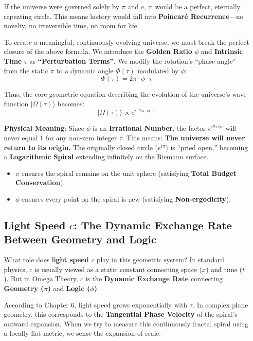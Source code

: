 If the universe were governed solely by $\pi$ and $e$, it would be a perfect, eternally repeating circle. This means history would fall into \textbf{Poincar\'{e} Recurrence}---no novelty, no irreversible time, no room for life.

To create a meaningful, continuously evolving universe, we must break the perfect closure of the above formula. We introduce the \textbf{Golden Ratio $\phi$} and \textbf{Intrinsic Time $\tau$} as \textbf{``Perturbation Terms''}.
We modify the rotation's ``phase angle'' from the static $\pi$ to a dynamic angle $\Phi(\tau)$ modulated by $\phi$:
\[\Phi(\tau) = 2\pi \cdot \phi \cdot \tau\]

Thus, the core geometric equation describing the evolution of the universe's wave function $|\Omega(\tau)\rangle$ becomes:
\[|\Omega(\tau)\rangle \propto e^{i \cdot 2\pi \cdot \phi \cdot \tau}\]

\textbf{Physical Meaning}:
Since $\phi$ is an \textbf{Irrational Number}, the factor $e^{i 2\pi \phi \tau}$ will never equal $1$ for any non-zero integer $\tau$.
This means: \textbf{The universe will never return to its origin.}
The originally closed circle ($e^{i\pi}$) is ``pried open,'' becoming a \textbf{Logarithmic Spiral} extending infinitely on the Riemann surface.
\begin{itemize}
\item \textbf{$\pi$} ensures the spiral remains on the unit sphere (satisfying \textbf{Total Budget Conservation}).
\item \textbf{$\phi$} ensures every point on the spiral is new (satisfying \textbf{Non-ergodicity}).
\end{itemize}

\subsection{Light Speed \texorpdfstring{$c$}{c}: The Dynamic Exchange Rate Between Geometry and Logic}

What role does \textbf{light speed $c$} play in this geometric system?
In standard physics, $c$ is usually viewed as a static constant connecting space ($x$) and time ($t$). But in Omega Theory, $c$ is the \textbf{Dynamic Exchange Rate} connecting \textbf{Geometry ($\pi$)} and \textbf{Logic ($\phi$)}.

According to Chapter 6, light speed grows exponentially with $\tau$. In complex plane geometry, this corresponds to the \textbf{Tangential Phase Velocity} of the spiral's outward expansion. When we try to measure this continuously fractal spiral using a locally flat metric, we sense the expansion of scale.

